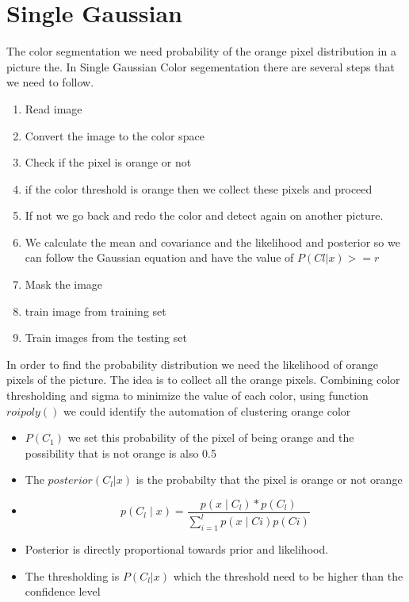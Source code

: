 \documentclass{article}
\begin{document}
\section{Single Gaussian}
The color segmentation we need probability of the orange pixel distribution in a picture the. In Single Gaussian Color segementation there are several steps that we need to follow. 
\begin{enumerate}
    \item Read image 
    \item Convert the image to the color space 
    \item Check if the pixel is orange or not
    \item if the color threshold is orange then we collect these pixels and proceed
    \item If not we go back and redo the color and detect again on another picture. 
    \item We calculate the mean and covariance and the likelihood and posterior so we can follow the Gaussian equation and have the value of $P(Cl|x)>=r$ 
    \item Mask the image
    \item train image from training set 
    \item Train images from the testing set
\end{enumerate}
In order to find the probability distribution we need the likelihood of orange pixels of the picture. The idea is to collect all the orange pixels. Combining color thresholding and sigma to minimize the value of each color, using function $roipoly()$ we could identify the automation of clustering orange color  
\begin{itemize}
    \item $P(C_1)$ we set this probability of the pixel of being orange and the possibility that is not orange is also 0.5
    \item The $posterior(C_l|x)$ is the probabilty that the pixel is orange or not orange
    \item \begin{equation}p(C_l \mid x)=\frac{p(x \mid C_l) * p(C_l)}{\sum_{i=1}^{l} p(x \mid Ci) p(C i)}\end{equation}
    \item Posterior is directly proportional towards prior and likelihood.
    \item The thresholding is $P(C_l|x)$ which the threshold need to be higher than the confidence level
\end{itemize}
\end{document}
